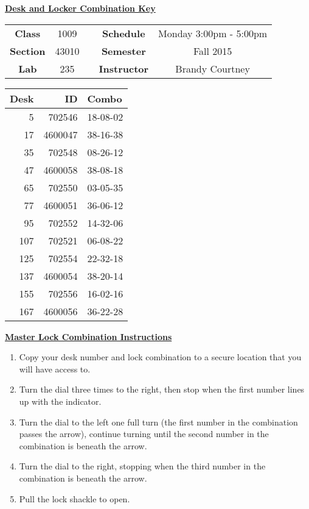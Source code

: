 \documentclass[12pt]{article}
\begin{document}
\thispagestyle{empty}

\begin{center}
	{\huge\textbf{\underline{ Desk and Locker Combination Key}}}
\end{center}


\begin{table}[h]
  \centering
  \begin{tabular}{ccccc}

  \textbf{Class} & 1009 & {\qquad} &\textbf{Schedule} & Monday 3:00pm - 5:00pm \\
  \textbf{Section} & 43010 & {\qquad} & \textbf{Semester} & Fall 2015 \\
  \textbf{Lab} & 235 & {\qquad} & \textbf{Instructor} & Brandy Courtney \\
  \end{tabular}
\end{table}
 \vspace{0.5in}
\begin{minipage}{0.4\textwidth}

\begin{tabular}{rrl}
\toprule
 Desk &       ID &     Combo \\
\midrule
    5 &   702546 &  18-08-02 \\
   17 &  4600047 &  38-16-38 \\
   35 &   702548 &  08-26-12 \\
   47 &  4600058 &  38-08-18 \\
   65 &   702550 &  03-05-35 \\
   77 &  4600051 &  36-06-12 \\
   95 &   702552 &  14-32-06 \\
  107 &   702521 &  06-08-22 \\
  125 &   702554 &  22-32-18 \\
  137 &  4600054 &  38-20-14 \\
  155 &   702556 &  16-02-16 \\
  167 &  4600056 &  36-22-28 \\
\bottomrule
\end{tabular}


\end{minipage}
\begin{minipage}{0.4\textwidth}
\underline{{\large \textbf{Master Lock Combination Instructions}}}
\begin{enumerate}
\item Copy your desk number and lock combination to a secure location that you will have access to.
\item Turn the dial three times to the right, then stop when the first number lines up with the indicator.
\item Turn the dial to the left one full turn (the first number in the combination passes the arrow), continue turning until the second number in the combination is beneath the arrow.
\item Turn the dial to the right, stopping when the third number in the combination is beneath the arrow.
\item Pull the lock shackle to open.
\end{enumerate}
\end{minipage}
\end{document}
